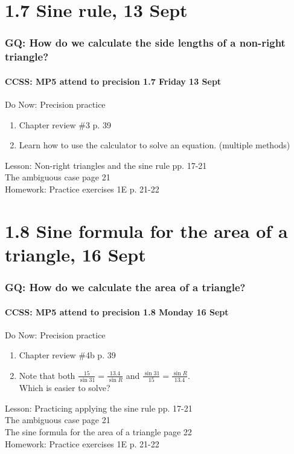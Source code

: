 \documentclass{beamer}
\begin{document}
  \section{1.7 Sine rule, 13 Sept}
  \frame
  {
    \frametitle{GQ: How do we calculate the side lengths of a non-right triangle?}
    \framesubtitle{CCSS: MP5 attend to precision \hfill \alert{1.7 Friday 13 Sept}}

    \begin{block}{Do Now: Precision practice}
    \begin{enumerate}
        \item Chapter review \#3 p. 39
        \item Learn how to use the calculator to solve an equation. (multiple methods)
    \end{enumerate}
    \end{block}
    Lesson: Non-right triangles and the sine rule pp. 17-21\\ \smallskip
    The ambiguous case page 21\\ \smallskip
    Homework: Practice exercises 1E p. 21-22
  }

  \section{1.8 Sine formula for the area of a triangle, 16 Sept}
  \frame
  {
    \frametitle{GQ: How do we calculate the area of a triangle?}
    \framesubtitle{CCSS: MP5 attend to precision \hfill \alert{1.8 Monday 16 Sept}}

    \begin{block}{Do Now: Precision practice}
    \begin{enumerate}
        \item Chapter review \#4b p. 39
        \item Note that both $\displaystyle \frac{15}{\sin 31}=\frac{13.4}{\sin R}$ and $\displaystyle \frac{\sin 31}{15}=\frac{\sin R}{13.4}$. \\ \bigskip
        Which is easier to solve?
    \end{enumerate}
    \end{block}
    Lesson: Practicing applying the sine rule pp. 17-21\\
    The ambiguous case page 21\\
    The sine formula for the area of a triangle page 22\\ \smallskip
    Homework: Practice exercises 1E p. 21-22
  }
\end{document}
